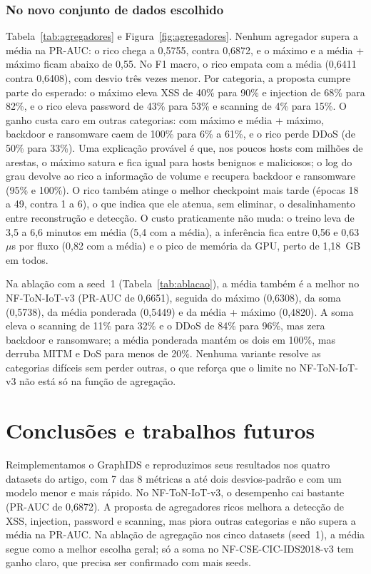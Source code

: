 \documentclass[conference]{IEEEtran}
\begin{document}
\subsubsection{No novo conjunto de dados escolhido}
Tabela~\ref{tab:agregadores} e
Figura~\ref{fig:agregadores}. Nenhum agregador supera a média na PR-AUC: o rico
chega a 0,5755, contra 0,6872, e o máximo e a média + máximo ficam abaixo de
0,55. No F1 macro, o rico empata com a média (0,6411 contra 0,6408), com desvio
três vezes menor. Por categoria, a proposta cumpre parte do esperado: o máximo
eleva XSS de 40\% para 90\% e injection de 68\% para 82\%, e o rico eleva
password de 43\% para 53\% e scanning de 4\% para 15\%. O ganho custa caro em
outras categorias: com máximo e média + máximo, backdoor e ransomware caem de
100\% para 6\% a 61\%, e o rico perde DDoS (de 50\% para 33\%). Uma explicação
provável é que, nos poucos hosts com milhões de arestas, o máximo satura e fica
igual para hosts benignos e maliciosos; o log do grau devolve ao rico a
informação de volume e recupera backdoor e ransomware (95\% e 100\%). O rico
também atinge o melhor checkpoint mais tarde (épocas 18 a 49, contra 1 a 6), o
que indica que ele atenua, sem eliminar, o desalinhamento entre reconstrução e
detecção. O custo praticamente não muda: o treino leva de 3,5 a 6,6 minutos
em média (5,4 com a média), a inferência fica entre 0,56 e 0,63~$\mu$s por
fluxo (0,82 com a média) e o pico de memória da GPU, perto de 1,18~GB em todos.

Na ablação com a seed~1 (Tabela~\ref{tab:ablacao}), a média também é a melhor
no NF-ToN-IoT-v3 (PR-AUC de 0,6651), seguida do máximo (0,6308), da soma
(0,5738), da média ponderada (0,5449) e da média + máximo (0,4820). A soma eleva
o scanning de 11\% para 32\% e o DDoS de 84\% para 96\%, mas zera backdoor e
ransomware; a média ponderada mantém os dois em 100\%, mas derruba MITM e DoS
para menos de 20\%. Nenhuma variante resolve as categorias difíceis sem perder
outras, o que reforça que o limite no NF-ToN-IoT-v3 não está só na função de
agregação.

\section{Conclusões e trabalhos futuros}
\label{sec:conclusao}

Reimplementamos o GraphIDS e reproduzimos seus resultados nos quatro datasets do
artigo, com 7 das 8 métricas a até dois desvios-padrão e com um modelo menor e
mais rápido. No NF-ToN-IoT-v3, o desempenho cai bastante (PR-AUC de 0,6872). A
proposta de agregadores ricos melhora a detecção de XSS, injection, password e
scanning, mas piora outras categorias e não supera a média na PR-AUC. Na
ablação de agregação nos cinco datasets (seed~1), a média segue como a melhor
escolha geral; só a soma no NF-CSE-CIC-IDS2018-v3 tem ganho claro, que precisa
ser confirmado com mais seeds.
\end{document}
